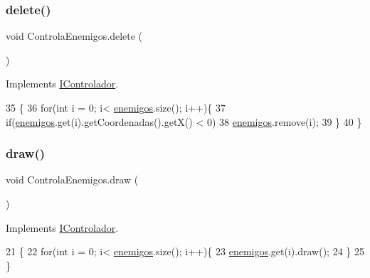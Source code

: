 \subsubsection{\texorpdfstring{delete()}{delete()}}
{\footnotesize\ttfamily void Controla\+Enemigos.\+delete (\begin{DoxyParamCaption}{ }\end{DoxyParamCaption})\hspace{0.3cm}{\ttfamily [inline]}}



Implements \mbox{\hyperlink{interface_i_controlador_a6a799d4959078e9b84d9de7fee44e0ba}{I\+Controlador}}.


\begin{DoxyCode}
35                          \{
36         \textcolor{keywordflow}{for}(\textcolor{keywordtype}{int} i = 0; i< \mbox{\hyperlink{class_controla_enemigos_a00bc1b9f42ef341339d0d7a00ed60319}{enemigos}}.size(); i++)\{
37             \textcolor{keywordflow}{if}(\mbox{\hyperlink{class_controla_enemigos_a00bc1b9f42ef341339d0d7a00ed60319}{enemigos}}.get(i).getCoordenadas().getX() < 0)
38             \mbox{\hyperlink{class_controla_enemigos_a00bc1b9f42ef341339d0d7a00ed60319}{enemigos}}.remove(i);
39         \}
40     \}
\end{DoxyCode}
\mbox{\label{class_controla_enemigos_af3ef61229a21ef509dcf8397e870666e}} 
\subsubsection{\texorpdfstring{draw()}{draw()}}
{\footnotesize\ttfamily void Controla\+Enemigos.\+draw (\begin{DoxyParamCaption}{ }\end{DoxyParamCaption})\hspace{0.3cm}{\ttfamily [inline]}}



Implements \mbox{\hyperlink{interface_i_controlador_a220648ff53334f380d52e2d2ec78e2e8}{I\+Controlador}}.


\begin{DoxyCode}
21                        \{
22         \textcolor{keywordflow}{for}(\textcolor{keywordtype}{int} i = 0; i< \mbox{\hyperlink{class_controla_enemigos_a00bc1b9f42ef341339d0d7a00ed60319}{enemigos}}.size(); i++)\{
23             \mbox{\hyperlink{class_controla_enemigos_a00bc1b9f42ef341339d0d7a00ed60319}{enemigos}}.get(i).draw();
24         \}
25     \}
\end{DoxyCode}
\mbox{\label{class_controla_enemigos_a0f43235e03225c9fbd077c5bfd2df923}} 
